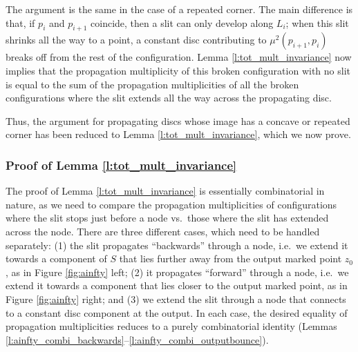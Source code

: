 \documentclass[11pt,leqno]{amsart}
\numberwithin{equation}{section}
\begin{document}
The argument is the same in the case of a repeated corner. The main
difference is that, if $p_{i}$ and $p_{i+1}$ coincide, then a slit can only
develop along $L_i$; when this slit shrinks all the
way to a point, a
constant disc contributing to $\mu^2(p_{i+1},p_i)$ breaks off from the rest
of the configuration. Lemma \ref{l:tot_mult_invariance} now implies that the
propagation multiplicity of this broken configuration with no slit is equal to the sum of
the propagation multiplicities of all the broken configurations where the
slit extends all the way across the propagating disc.

Thus, the argument for propagating discs whose image has a concave
or repeated corner has been reduced to Lemma \ref{l:tot_mult_invariance}, which we now
prove.

\subsubsection{Proof of Lemma \ref{l:tot_mult_invariance}}\label{sss:proof_lemma_tot}
The proof of Lemma \ref{l:tot_mult_invariance} is essentially combinatorial
in nature, as we need to compare the propagation multiplicities of configurations where
the slit stops just before a node vs.\ those where the slit has extended across
the node. There are three different cases, which need to be handled
separately: (1) the slit propagates ``backwards''
through a node, i.e.\ we extend it towards a component of $S$ that lies further away from the output
marked point $z_0$,
as in Figure \ref{fig:ainfty} left; (2) it propagates
``forward'' through a node, i.e.\ we extend it towards a component that lies
closer to the output marked point, as in Figure \ref{fig:ainfty}
right; and (3) we extend the slit through a node that
connects to a constant disc component at the output. In each case, the
desired equality of propagation multiplicities reduces to a purely combinatorial identity (Lemmas
\ref{l:ainfty_combi_backwards}--\ref{l:ainfty_combi_outputbounce}).
\end{document}
